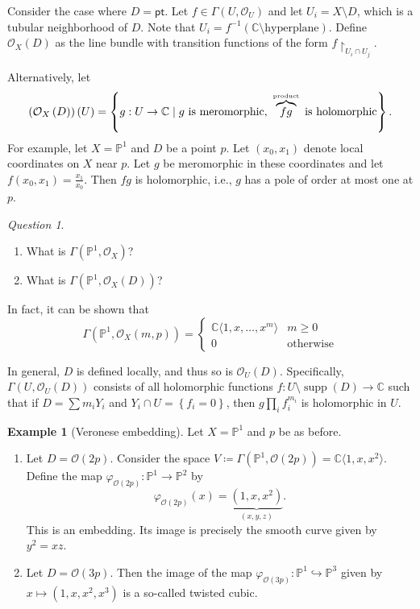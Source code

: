 \documentclass[10pt,letterpaper,cm]{nupset}
\theoremstyle{definition}
\newtheorem{exmp}[defn]{Example}
\theoremstyle{theorem}
\theoremstyle{remark}
\newtheorem*{question}{Question}
\newcommand{\C}{\mathbb C}
\renewcommand{\O}{\mathcal O}
\renewcommand{\P}{\mathbb P}
\newcommand{\1}{\mathbb{1}}
\newcommand{\0}{\vec 0}
\newcommand{\pt}{\mathsf{pt}}
\DeclareMathOperator{\supp}{supp}
\newcommand{\be}{\begin{enumerate}}
\newcommand{\ee}{\end{enumerate}}
\begin{document}
\medskip

Consider the case where $D = \pt$. Let $f \in \Gamma\left(U, \O_U\right)$ and let $U_i = X \setminus D$, which is a tubular neighborhood of $D$. Note that $U_i = f^{-1}\left (\C\setminus\text{hyperplane}\right)$. Define $\O_X(D)$ as the line bundle with transition functions of the form $f \restriction_{U_i \cap U_j}$.

\medskip

Alternatively, let $$\left(\O_X\left(D\right)\right)\left(U\right) = \left\{g : U \to \C  \mid g \text{ is meromorphic}, \ \overbrace{fg}^{\text{\tiny product}} \text{ is holomorphic}\right\}.$$
For example,
let $X = \P^1$ and $D$ be a point $p$. Let $\left(x_0, x_1\right)$ denote local coordinates on $X$ near $p$. Let $g$ be meromorphic in these coordinates and let $f\left(x_0, x_1\right) = \frac{x_1}{x_0}$. Then $f{g}$ is holomorphic, i.e., $g$ has a pole of order at most one at $p$. 
\begin{question} $ $
\be
\item What is $\Gamma\left(\P^1, \O_X\right)$?
\item What is $\Gamma\left(\P^1, \O_X\left(D\right)\right)$?
\ee
\end{question}

In fact, it can be shown that
\[
\Gamma\left(\P^1, \O_X\left(m,p\right)\right) = \begin{cases}
\C\langle 1, x, \ldots, x^m\rangle & m \geq 0 
\\ 0 & \text{otherwise}
\end{cases}
\]

\bigskip

In general, $D$ is defined locally, and thus so is $\O_U(D)$. Specifically,
$\Gamma\left(U, \O_U\left(D\right)\right)$ consists of all holomorphic functions $f : U \setminus \supp\left(D\right) \to \C$ such that if $D = \sum m_iY_i$ and $Y_i \cap U = \left\{f_i =0\right\}$, then $g\prod_if_i^{m_i}$ is holomorphic in $U$.

\begin{exmp}[Veronese embedding]
Let $X = \P^1$ and $p$ be as before. 
\be
\item Let $D = \O(2p)$. Consider the space $V \coloneqq \Gamma\left(\P^1, \O\left(2p\right)\right) = \C\langle 1, x, x^2\rangle.$ Define the map $\varphi_{\O(2p)} : \P^1 \to \P^2$ by $$\varphi_{\O(2p)}(x) = \underbrace{\left(1, x, x^2\right)}_{\left(x,y,z\right)}.$$ This is an embedding. Its image is precisely the smooth curve given by $y^2 = xz$.
\item Let $D = \O(3p)$. Then the image of the map $\varphi_{\O(3p)} : \P^1 \hookrightarrow \P^3$ given by $x \mapsto \left(1, x, x^2, x^3\right)$ is a so-called twisted cubic.
\ee
\end{exmp}
\end{document}
